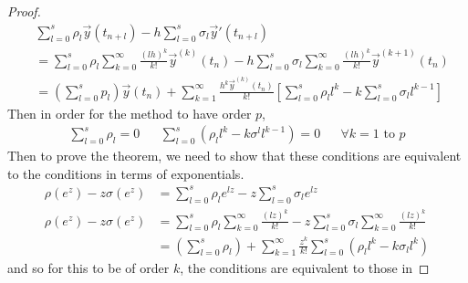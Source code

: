 \documentclass[../Main.tex]{subfiles}
\begin{document}
\begin{proof}
    \begin{align*}
        &\sum_{l = 0}^s \rho_l \vec{y}(t_{n + l}) - h \sum_{l=0}^{s} \sigma_l \vec{y}'(t_{n + l}) \\
        &= \sum_{l = 0}^{s} \rho_l \sum_{k=0}^{\infty} \frac{(lh)^k}{k!} \vec{y}^{(k)}(t_n) - h\sum_{l=0}^{s} \sigma_l \sum_{k=0}^{\infty} \frac{(lh)^k}{k!} \vec{y}^{(k+1)}(t_n) \\
        &= \left(\sum_{l=0}^{s} p_l \right) \vec{y}(t_n) + \sum_{k=1}^{\infty} \frac{h^k \vec{y}^{(k)}(t_n)}{k!} \left[\sum_{l=0}^{s} \rho_l l^k - k \sum_{l=0}^{s} \sigma_l l^{k-1}\right]
    \end{align*}
    Then in order for the method to have order $p$,
    \begin{align}
        \sum_{l=0}^{s} \rho_l = 0&& \sum_{l = 0}^{s} (\rho_l l^k - k \sigma^l l^{k-1}) = 0 && \forall k = 1 \text{ to } p
        \label{eqnExpConvergenceSubConditions}
    \end{align}
    Then to prove the theorem, we need to show that these conditions are equivalent to the conditions in terms of exponentials. 
    \begin{align*}
        \rho(e^z) - z\sigma(e^z) &= \sum_{l=0}^{s} \rho_l e^{lz} - z \sum_{l=0}^{s} \sigma_l e^{lz} \\
        \rho(e^z) - z\sigma(e^z) &= \sum_{l=0}^{s} \rho_l \sum_{k=0}^{\infty} \frac{(lz)^k}{k!} - z \sum_{l=0}^{s} \sigma_l \sum_{k=0}^{\infty} \frac{(lz)^k}{k!} \\
        &= \left(\sum_{l=0}^{s}\rho_l\right) + \sum_{k=1}^{\infty} \frac{z^k}{k!} \sum_{l=0}^{s} \left(\rho_l l^k - k \sigma_l l^k\right)
    \end{align*}
    and so for this to be of order $k$, the conditions are equivalent to those in 
\end{proof}
\end{document}
